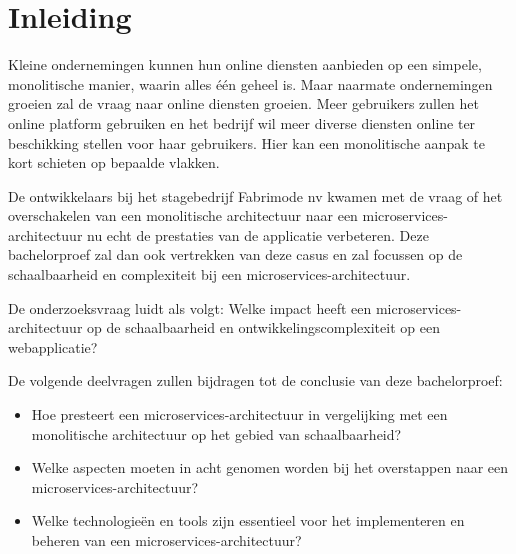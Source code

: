 


% 

\section{Inleiding}%
\label{sec:inleiding}

Kleine ondernemingen kunnen hun online diensten aanbieden op een simpele, monolitische manier, waarin alles één geheel is. Maar naarmate ondernemingen groeien zal de vraag naar online diensten groeien. Meer gebruikers zullen het online platform gebruiken en het bedrijf wil meer diverse diensten online ter beschikking stellen voor haar gebruikers. Hier kan een monolitische aanpak te kort schieten op bepaalde vlakken.

De ontwikkelaars bij het stagebedrijf Fabrimode nv kwamen met de vraag of het overschakelen van een monolitische architectuur naar een microservices-architectuur nu echt de prestaties van de applicatie verbeteren. Deze bachelorproef zal dan ook vertrekken van deze casus en zal focussen op de schaalbaarheid en complexiteit bij een microservices-architectuur.

De onderzoeksvraag luidt als volgt: Welke impact heeft een microservices-architectuur op de schaalbaarheid en ontwikkelingscomplexiteit op een webapplicatie?

De volgende deelvragen zullen bijdragen tot de conclusie van deze bachelorproef:
\begin{itemize}
	\item Hoe presteert een microservices-architectuur in vergelijking met een monolitische architectuur op het gebied van schaalbaarheid?
	\item Welke aspecten moeten in acht genomen worden bij het overstappen naar een microservices-architectuur?
	\item Welke technologieën en tools zijn essentieel voor het implementeren en beheren van een microservices-architectuur?
\end{itemize}

